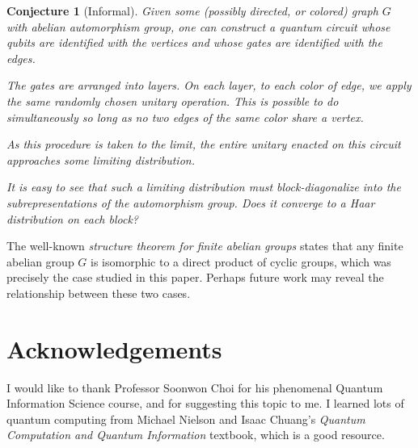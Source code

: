 \documentclass[fleqn,12pt]{article}
\newcommand{\CC}{\mathbb{C}}
\newcommand{\CZ}{\mathbf{CZ}}
\newtheorem{conjecture}{Conjecture}
\begin{document}
\begin{conjecture}
    [Informal]
    Given some (possibly directed, or colored) graph $G$ with
    abelian automorphism group,
    one can construct a quantum circuit whose qubits are identified
    with the vertices and whose gates are identified with the edges.

    The gates are arranged into layers. On each layer, to each color
    of edge, we apply the \emph{same} randomly chosen unitary operation.
    This is possible to do simultaneously so long as no two edges
    of the same color share a vertex.

    As this procedure is taken to the limit, the entire unitary enacted
    on this circuit approaches some limiting distribution.

    It is easy to see that such a limiting distribution must block-diagonalize
    into the subrepresentations of the automorphism
    group. Does it converge to a Haar distribution on each block?
\end{conjecture}

The well-known \emph{structure theorem for finite abelian groups} states
that any finite abelian group $G$ is isomorphic to a direct product of
cyclic groups, which was precisely the case studied in this paper.
Perhaps future work may reveal the relationship between these two cases.

\section{Acknowledgements}

I would like to thank Professor Soonwon Choi for his phenomenal Quantum
Information Science course, and for suggesting this topic to me.
I learned lots of quantum computing from Michael
Nielson and Isaac Chuang's \emph{Quantum Computation and Quantum
    Information} textbook, which is a good resource.




\end{document}
